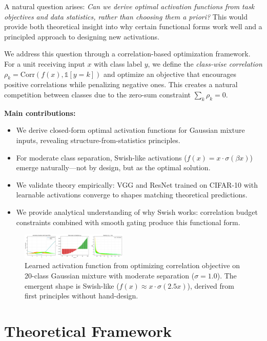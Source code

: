 \documentclass{article}
\begin{document}
A natural question arises: \textit{Can we derive optimal activation functions from task objectives and data statistics, rather than choosing them a priori?} This would provide both theoretical insight into why certain functional forms work well and a principled approach to designing new activations.

We address this question through a correlation-based optimization framework. For a unit receiving input $x$ with class label $y$, we define the \textit{class-wise correlation} $\rho_k = \text{Corr}(f(x), \mathbb{1}[y=k])$ and optimize an objective that encourages positive correlations while penalizing negative ones. This creates a natural competition between classes due to the zero-sum constraint $\sum_k \rho_k = 0$.

\textbf{Main contributions:}
\begin{itemize}
\item We derive closed-form optimal activation functions for Gaussian mixture inputs, revealing structure-from-statistics principles.
\item For moderate class separation, Swish-like activations ($f(x) = x \cdot \sigma(\beta x)$) emerge naturally—not by design, but as the optimal solution.
\item We validate theory empirically: VGG and ResNet trained on CIFAR-10 with learnable activations converge to shapes matching theoretical predictions.
\item We provide analytical understanding of why Swish works: correlation budget constraints combined with smooth gating produce this functional form.
\end{itemize}

\begin{figure}[t]
\centering
\includegraphics[width=0.45\textwidth]{figures/fig2.png}
\caption{Learned activation function from optimizing correlation objective on 20-class Gaussian mixture with moderate separation ($\sigma=1.0$). The emergent shape is Swish-like ($f(x) \approx x \cdot \sigma(2.5x)$), derived from first principles without hand-design.}
\label{fig:main_result}
\end{figure}

\section{Theoretical Framework}
\label{sec:theory}
\end{document}
